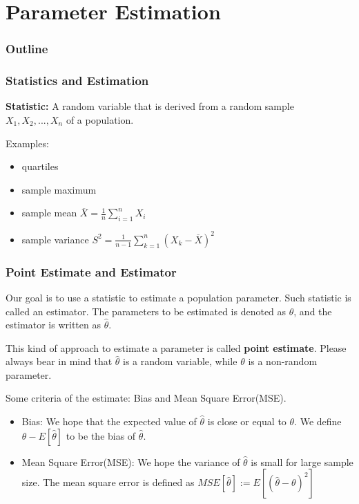 \documentclass{beamer}
\begin{document}
\section{Parameter Estimation}
\begin{frame}
    \frametitle{Outline}
    \tableofcontents[currentsection]
\end{frame}
\begin{frame}
    \frametitle{Statistics and Estimation}
    \textbf{Statistic:} A random variable that is derived from a random sample $X_1,X_2,...,X_n$ of a population.\par
    Examples:
    \begin{itemize}
        \item quartiles
        \item sample maximum
        \item sample mean $\overline{X}=\frac{1}{n}\sum\limits_{i=1}^n X_i$
        \item sample variance $S^2=\frac{1}{n-1}\sum\limits_{k=1}^n (X_k-\overline{X})^2$
    \end{itemize}
    

\end{frame}

\begin{frame}
    \frametitle{Point Estimate and Estimator}
    Our goal is to use a statistic to estimate a population parameter. Such statistic is called an estimator. The parameters to be estimated is denoted as $\theta$, and the estimator is written as $\hat{\theta}$.\par
    This kind of approach to estimate a parameter is called \textbf{point estimate}.
    Please always bear in mind that $\hat{\theta}$ is a random variable, while $\theta$ is a non-random parameter.\par
    Some criteria of the estimate: Bias and Mean Square Error(MSE).
    \begin{itemize}
        \item Bias: We hope that the expected value of $\hat{\theta}$ is close or equal to $\theta$. We define $\theta-E[\hat{\theta}]$ to be the bias of $\hat{\theta}$.
        \item Mean Square Error(MSE): We hope the variance of $\hat{\theta}$ is small for large sample size. The mean square error is defined as $MSE[\hat{\theta}]:=E[(\hat{\theta}-\theta)^2]$
    \end{itemize}
    

\end{frame}
\end{document}
